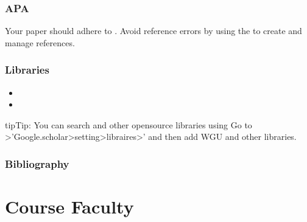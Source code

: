 \documentclass[letterpaper,10pt,english]{jupyterBook}
\begin{document}
\subsection{APA}
\label{\detokenize{resources:apa}}\label{\detokenize{resources:resources-gen-apa}}
\sphinxAtStartPar
Your paper should adhere to . Avoid reference errors by using the  to create and manage references.


\subsection{Libraries}
\label{\detokenize{resources:libraries}}\label{\detokenize{resources:resources-gen-libraries}}\begin{itemize}
\item {} 
\sphinxAtStartPar
{}

\item {} 
\sphinxAtStartPar
{}

\end{itemize}

\begin{sphinxadmonition}{tip}{Tip:}
\sphinxAtStartPar
You can search  and other open\sphinxhyphen{}source libraries using  Go to >’Google.scholar>setting>libraires>’ and then add WGU and other libraries.


\end{sphinxadmonition}


\subsection{Bibliography}
\label{\detokenize{resources:bibliography}}
\sphinxstepscope


\chapter{Course Faculty}
\label{\detokenize{ci_page:course-faculty}}\label{\detokenize{ci_page:cipage}}\label{\detokenize{ci_page::doc}}
\end{document}
